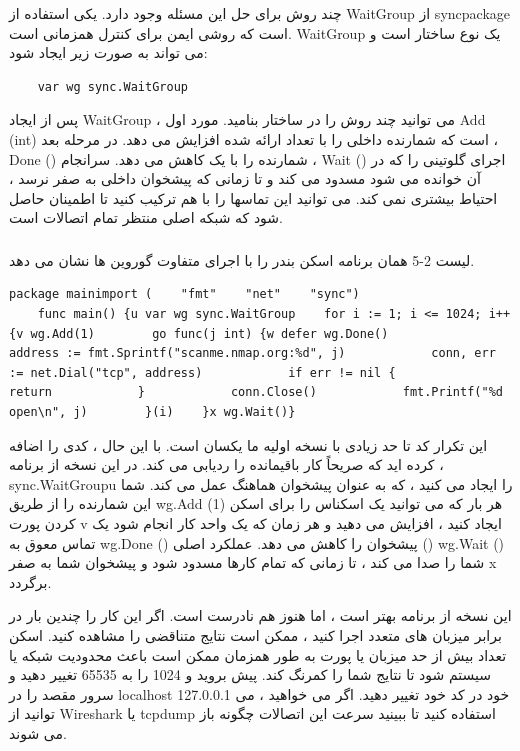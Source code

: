 \documentclass[12pt]{book}
\begin{document}
چند روش برای حل این مسئله وجود دارد. یکی استفاده از WaitGroup از syncpackage است که روشی ایمن برای کنترل همزمانی است. WaitGroup یک نوع ساختار است و می تواند به صورت زیر ایجاد شود:
\begin{latin}
	\begin{lstlisting}
	var wg sync.WaitGroup
	\end{lstlisting}
\end{latin}
پس از ایجاد WaitGroup ، می توانید چند روش را در ساختار بنامید. مورد اول Add (int) است که شمارنده داخلی را با تعداد ارائه شده افزایش می دهد. در مرحله بعد ، Done () شمارنده را با یک کاهش می دهد. سرانجام ، Wait () اجرای گلوتینی را که در آن خوانده می شود مسدود می کند و تا زمانی که پیشخوان داخلی به صفر نرسد ، احتیاط بیشتری نمی کند. می توانید این تماسها را با هم ترکیب کنید تا اطمینان حاصل شود که شبکه اصلی منتظر تمام اتصالات است.
\subsubsection{}
لیست 2-5 همان برنامه اسکن بندر را با اجرای متفاوت گوروین ها نشان می دهد.
\begin{latin}
	\begin{lstlisting}[caption={ A synchronized scanner that uses WaitGroup (https://github.com/blackhat-go/bhg/ch-2/tcp-scanner-wg-too-fast/main.go/)},captionpos=b]
	package mainimport (    "fmt"    "net"    "sync")
	func main() {u var wg sync.WaitGroup    for i := 1; i <= 1024; i++ {v wg.Add(1)        go func(j int) {w defer wg.Done()            address := fmt.Sprintf("scanme.nmap.org:%d", j)            conn, err := net.Dial("tcp", address)            if err != nil {                return            }            conn.Close()            fmt.Printf("%d open\n", j)        }(i)    }x wg.Wait()}
	\end{lstlisting}
\end{latin}

این تکرار کد تا حد زیادی با نسخه اولیه ما یکسان است. با این حال ، کدی را اضافه کرده اید که صریحاً کار باقیمانده را ردیابی می کند. در این نسخه از برنامه ، sync.WaitGroupu را ایجاد می کنید ، که به عنوان پیشخوان هماهنگ عمل می کند. شما این شمارنده را از طریق wg.Add (1) هر بار که می توانید یک اسکناس را برای اسکن کردن پورت v ایجاد کنید ، افزایش می دهید و هر زمان که یک واحد کار انجام شود یک تماس معوق به wg.Done () پیشخوان را کاهش می دهد. عملکرد اصلی () wg.Wait () شما را صدا می کند ، تا زمانی که تمام کارها مسدود شود و پیشخوان شما به صفر x برگردد.

این نسخه از برنامه بهتر است ، اما هنوز هم نادرست است. اگر این کار را چندین بار در برابر میزبان های متعدد اجرا کنید ، ممکن است نتایج متناقضی را مشاهده کنید. اسکن تعداد بیش از حد میزبان یا پورت به طور همزمان ممکن است باعث محدودیت شبکه یا سیستم شود تا نتایج شما را کمرنگ کند. پیش بروید و 1024 را به 65535 تغییر دهید و سرور مقصد را در localhost 127.0.0.1 خود در کد خود تغییر دهید. اگر می خواهید ، می توانید از Wireshark یا tcpdump استفاده کنید تا ببینید سرعت این اتصالات چگونه باز می شوند.
\end{document}
